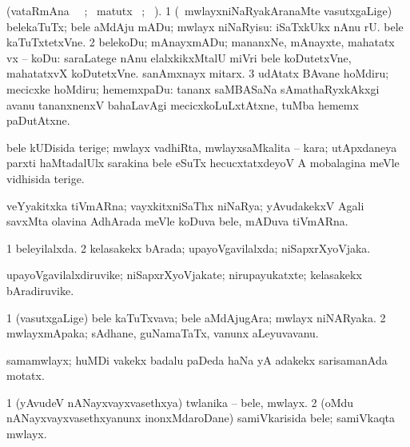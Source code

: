 \bentry 
{} 
\gl{\sakirx}(vataRmAna \parxpu\ \Eva\ ; \BU\ matutx \BUkaq\ ; \vakaq\ ). 
\bmng
\bnum
\num{1} (\kanmu\ mwlayxniNaRyakAranaMte vasutxgaLige) belekaTuTx; bele aMdAju mADu; mwlayx niNaRyisu:   iSaTxkUkx nAnu  rU. bele kaTuTxtetxVne. 
\num{2} belekoDu; mAnayxmADu; mananxNe, mAnayxte, mahatatx vx -- koDu:  saraLatege nAnu elalxkikxMtalU miVri bele koDutetxVne, mahatatxvX koDutetxVne.  sanAmxnayx mitarx. 
\num{3} udAtatx BAvane hoMdiru; mecicxke hoMdiru; hememxpaDu:  tananx saMBASaNa sAmathaRyxkAkxgi avanu tananxnenxV bahaLavAgi mecicxkoLuLxtAtxne, tuMba hememx paDutAtxne. 
\enum
\emng
\eentry

\bentry
{}
\gl{\nA}
\expl{}
\bmng
 bele kUDisida terige; mwlayx vadhiRta, mwlayxsaMkalita -- kara; utApxdaneya parxti haMtadalUlx sarakina bele eSuTx hecucxtatxdeyoV A mobalagina meVle vidhisida terige. 
\emng
\eentry

\bentry
{}
\gl{\nA}
\expl{}
\bmng
 veYyakitxka tiVmARna; vayxkitxniSaThx niNaRya; yAvudakekxV Agali savxMta olavina AdhArada meVle koDuva bele, mADuva tiVmARna. 
\emng
\eentry

\bentry
{} 
\gl{\gu}
\expl{}
\bmng
\bnum
\num{1} beleyilalxda. 
\num{2} kelasakekx bArada; upayoVgavilalxda; niSapxrXyoVjaka. 
\enum
\emng
\eentry

\bentry
{} 
\gl{\nA}
\expl{}
\bmng
 upayoVgavilalxdiruvike; niSapxrXyoVjakate; nirupayukatxte; kelasakekx bAradiruvike. 
\emng
\eentry

\bentry
{} 
\gl{\nA}
\expl{}
\bmng
\bnum
\num{1} (vasutxgaLige) bele kaTuTxvava; bele aMdAjugAra; mwlayx niNARyaka. 
\num{2} mwlayxmApaka; sAdhane, guNamaTaTx, \mo vanunx aLeyuvavanu. 
\enum
\emng
\eentry

\bentry
{}
\gl{\nA}
\expl{}
\bmng
 samamwlayx; huMDi \mo vakekx badalu paDeda haNa yA adakekx sarisamanAda motatx. 
\emng
\eentry

\bentry
{} 
\gl{\nA}
\expl{}
\bmng
\bnum
\num{1} (yAvudeV nANayxvayxvasethxya) twlanika -- bele, mwlayx. 
\num{2} (oMdu nANayxvayxvasethxyanunx inonxMdaroDane) samiVkarisida bele; samiVkaqta mwlayx. 
\enum
\emng
\eentry

